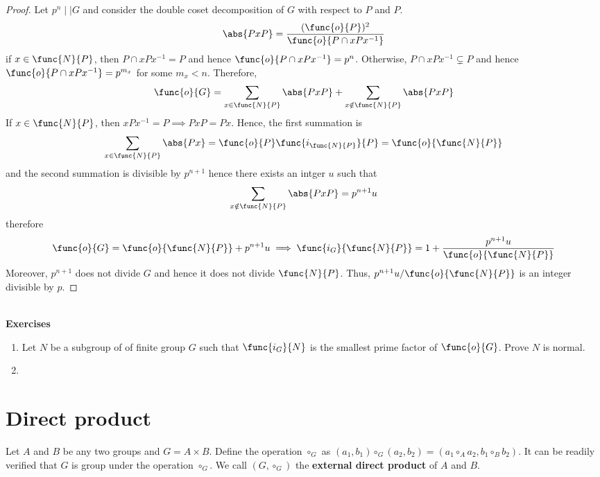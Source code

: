 \begin{proof}
    Let  \(p^n \mid\mid G\) and consider the double coset decomposition of \(G\) with respect to \(P\) and \(P\). 
    \begin{equation*}
        \abs{PxP} = \dfrac{(\func{o}{P})^2}{\func{o}{P \cap xPx^{-1}}}
    \end{equation*}
    if \(x \in \func{N}{P}\), then \(P \cap xPx^{-1} = P\) and hence \(\func{o}{P \cap xPx^{-1}} = p^n\). Otherwise, \(P \cap xPx^{-1} \subsetneq P\) and hence \(\func{o}{P \cap xPx^{-1}} = p^{m_x}\) for some \(m_x < n\). Therefore, 
    \begin{align*}
        \func{o}{G} = \sum_{x \in \func{N}{P}} \abs{PxP}  + \sum_{x \notin \func{N}{P}} \abs{PxP} 
    \end{align*}
    If \(x \in \func{N}{P}\), then \(xPx^{-1} = P \implies PxP = Px\). Hence, the first summation is 
    \begin{equation*}
        \sum_{x \in \func{N}{P}} \abs{Px}  = \func{o}{P} \func{i_{\func{N}{P}}}{P} = \func{o}{\func{N}{P}}
    \end{equation*}
    and the second summation is divisible by \(p^{n+1}\) hence there exists an intger \(u\) such that
    \begin{equation*}
        \sum_{x \notin \func{N}{P}} \abs{PxP} = p^{n+1}u
    \end{equation*}
    therefore 
    \begin{align*}
        \func{o}{G} = \func{o}{\func{N}{P}} + p^{n+1}u \implies \func{i_G}{\func{N}{P}} = 1 + \dfrac{p^{n+1} u}{ \func{o}{\func{N}{P}}}
    \end{align*}
    Moreover, \(p^{n+1}\) does not divide \(G\) and hence it does not divide \(\func{N}{P}\). Thus, \(p^{n+1} u /\func{o}{\func{N}{P}}\) is an integer divisible by 
    \(p\).
\end{proof}
\ \\ 
{\Large{\textbf{Exercises}}}
\begin{enumerate}
    \item Let \(N\) be a subgroup of of finite group \(G\) such that \(\func{i_G}{N}\) is the smallest prime factor of \(\func{o}{G}\). Prove \(N\) is normal.
    \item 
\end{enumerate}

\section{Direct product}
Let \(A\) and \(B\) be any two groups and \(G = A \times B\). Define the operation \(\circ_G\) as \((a_1,b_1) \circ_G (a_2,b_2) = (a_1\circ_A a_2, b_1 \circ_B b_2)\). It can be readily verified that \(G\) is group under the operation \(\circ_G\). We call \((G,\circ_G)\) the \textbf{external direct product} of \(A\) and \(B\).

